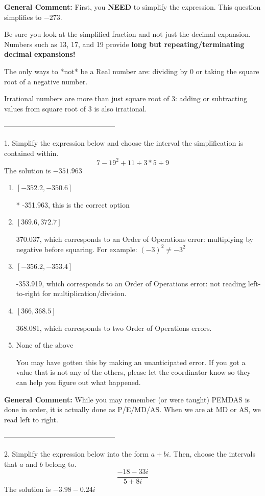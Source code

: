 \documentclass{extbook}[14pt]
\begin{document}
\textbf{General Comment:} First, you \textbf{NEED} to simplify the expression. This question simplifies to $-273$. 
 
 Be sure you look at the simplified fraction and not just the decimal expansion. Numbers such as 13, 17, and 19 provide \textbf{long but repeating/terminating decimal expansions!} 
 
 The only ways to *not* be a Real number are: dividing by 0 or taking the square root of a negative number. 
 
 Irrational numbers are more than just square root of 3: adding or subtracting values from square root of 3 is also irrational. 

-----------------------------------------------

1. Simplify the expression below and choose the interval the simplification is contained within.
\[ 7 - 19^2 + 11 \div 3 * 5 \div 9 \] 
The solution is $ -351.963 $ 

\begin{enumerate}[label=\Alph*.] 
\item $ [-352.2, -350.6] $ 

 * -351.963, this is the correct option 
\item $ [369.6, 372.7] $ 

  370.037, which corresponds to an Order of Operations error: multiplying by negative before squaring. For example: $(-3)^2 \neq -3^2$ 
\item $ [-356.2, -353.4] $ 

  -353.919, which corresponds to an Order of Operations error: not reading left-to-right for multiplication/division. 
\item $ [366, 368.5] $ 

  368.081, which corresponds to two Order of Operations errors. 
\item $ \text{None of the above} $ 

  You may have gotten this by making an unanticipated error. If you got a value that is not any of the others, please let the coordinator know so they can help you figure out what happened. 
\end{enumerate} 
 
\textbf{General Comment:} While you may remember (or were taught) PEMDAS is done in order, it is actually done as P/E/MD/AS. When we are at MD or AS, we read left to right. 

-----------------------------------------------

2. Simplify the expression below into the form $a+bi$. Then, choose the intervals that $a$ and $b$ belong to.
\[ \frac{-18 - 33 i}{5 + 8 i} \] 
The solution is $ -3.98  - 0.24 i $ 
\end{document}
